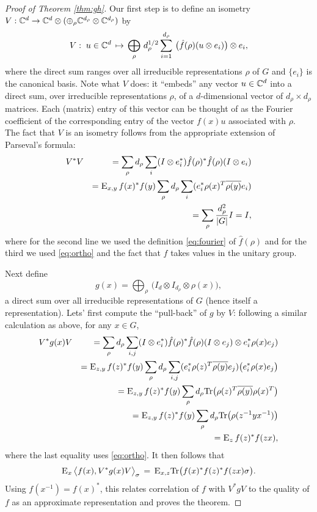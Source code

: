 \begin{proof}[Proof of Theorem \ref{thm:gh}]
Our first step is to define an isometry $V:\mathbb{C}^d \to \mathbb{C}^d \otimes (\oplus_\rho \mathbb{C}^{d_\rho} \otimes \mathbb{C}^{d_\rho})$ by
$$ V :\;u \in \mathbb{C}^d \,\mapsto\, \bigoplus_\rho \,d_\rho^{1/2} \sum_{i=1}^{d_\rho} \,\big(\hat{f}(\rho) (u\otimes e_i)\big) \otimes e_i,$$
where the direct sum ranges over all irreducible representations $\rho$ of $G$ and $\{e_i\}$ is the canonical basis. 
Note what $V$ does: it ``embeds'' any vector $u\in \mathbb{C}^d$ into a direct sum, over irreducible representations $\rho$, of a $d$-dimensional vector of $d_\rho\times d_\rho$ matrices. Each (matrix) entry of this vector can be thought of as the Fourier coefficient of the corresponding entry of the vector $f(x)u$ associated with $\rho$. 
The fact that $V$ is an isometry follows from the appropriate extension of Parseval's formula:  
\begin{eqnarray*}
& V^* V &= \sum_\rho d_\rho \sum_i (I\otimes e_i^*) \hat{f}(\rho)^*\hat{f}(\rho) (I\otimes e_i)\\
&&= \textsc{E}_{x,y}\,  f(x)^*f(y) \sum_\rho d_\rho \sum_i  (e_i^* \rho(x)^T \overline{\rho(y)} e_i)\\
&&= \sum_\rho \frac{d_\rho^2}{|G|}I = I,
\end{eqnarray*}
where for the second line we used the definition \eqref{eq:fourier} of $\hat{f}(\rho)$ and  for the third we used \eqref{eq:ortho} and the fact that $f$ takes values in the unitary group.

Next define
$$g(x) = \bigoplus_\rho \,\big(I_d \otimes I_{d_\rho} \otimes \rho(x)\big), $$
a direct sum over all irreducible representations of $G$ (hence itself a representation). Lets' first compute the ``pull-back'' of $g$ by $V$: following a similar calculation as above, for any $x\in G$, 
\begin{eqnarray*}
& V^*g(x) V  &=  \sum_{\rho}  d_\rho \sum_{i,j} (I\otimes e_i^*)\hat{f}(\rho)^* \hat{f}(\rho)(I\otimes e_j) \otimes e_i^* \rho(x) e_j ) \\
&& =  \textsc{E}_{z,y}\,  f(z)^*f(y)  \sum_{\rho}  d_\rho \sum_{i,j} (e_i^* \rho(z)^T \overline{\rho(y)} e_j) \big( e_i^* \rho(x) e_j \big) \\
&& =  \textsc{E}_{z,y}\,  f(z)^*f(y)  \sum_{\rho}  d_\rho \mathrm{Tr}\big( \rho(z)^T \overline{\rho(y)}  {\rho(x)^T} \big) \\
&& =  \textsc{E}_{z,y}\,  f(z)^*f(y)  \sum_{\rho}  d_\rho \mathrm{Tr}\big( \rho(z^{-1}y x^{-1}) \big) \\
&& =  \textsc{E}_{z}\,  f(z)^*f(zx) , 
\end{eqnarray*}
where the last equality uses \eqref{eq:ortho}.
It then follows that 
\begin{eqnarray*}
\textsc{E}_{x}\, \big\langle f(x), V^*g(x) V \big\rangle_\sigma \,=\,  \textsc{E}_{x,z} \mathrm{Tr}\big( f(x)^* f(z)^* f(zx)\sigma\big).
\end{eqnarray*}  
Using $f(x^{-1})=f(x)^*$, this relates correlation of $f$ with $V^*gV$ to the quality of $f$ as an approximate representation and proves the theorem. 
\end{proof}

